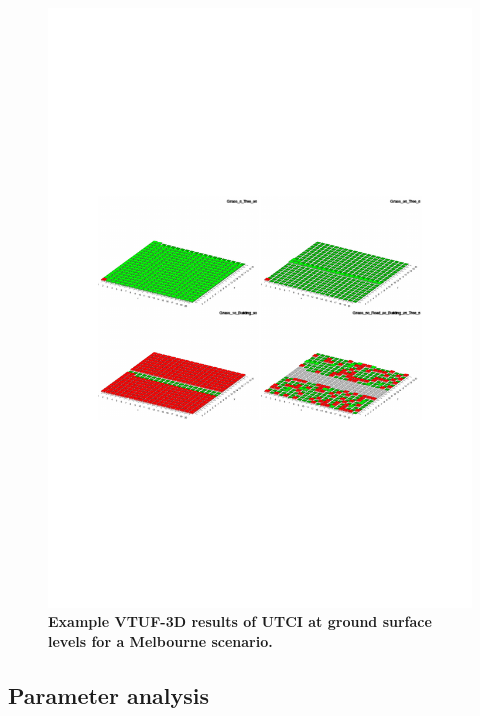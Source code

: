 \documentclass[final,3p,times,authoryear]{elsarticle}
\begin{document}
\begin{figure}
\centering
\includegraphics[page=2,trim={75 240 60 240},clip,scale=0.40]{Figures/PresentationImages.pdf}
\caption{\bf Example VTUF-3D results of UTCI at ground surface levels for a Melbourne scenario.}
 \label{fig:vtufresults}
\end{figure} 

\subsection{Parameter analysis}\label{sec:methodsparam}
\end{document}
